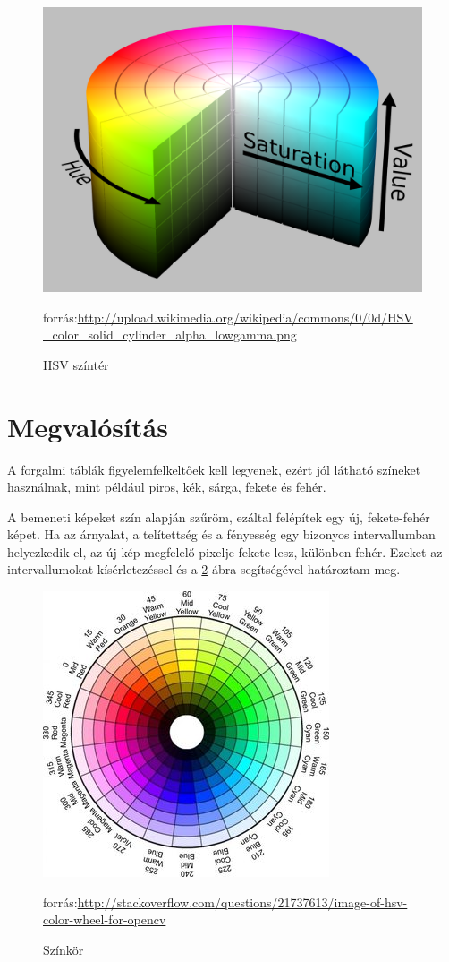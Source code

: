 \begin{figure}[h]
\centering

\includegraphics[scale=0.1]{HSVColorSpace}
\caption{HSV színtér}
\small forrás:\url{http://upload.wikimedia.org/wikipedia/commons/0/0d/HSV_color_solid_cylinder_alpha_lowgamma.png}
\label{fig:HSVColorSpace}
\end{figure}

\section{Megvalósítás}\label{sec:PREPROC:implement}

A forgalmi táblák figyelemfelkeltőek kell legyenek, ezért jól látható színeket használnak, mint például piros, kék, sárga, fekete és fehér.

A bemeneti képeket szín alapján szűröm, ezáltal felépítek egy új, fekete-fehér képet. Ha az árnyalat, a telítettség és a fényesség egy bizonyos intervallumban helyezkedik el, az új kép megfelelő pixelje fekete lesz, különben fehér. Ezeket az intervallumokat kísérletezéssel és a \ref{fig:colorWheel} ábra segítségével határoztam meg.

\begin{figure}[h]

\centering 
\includegraphics[scale=0.5]{ColorWheel}
\caption{Színkör}
\small forrás:\url{http://stackoverflow.com/questions/21737613/image-of-hsv-color-wheel-for-opencv}
\label{fig:colorWheel} 

\end{figure}

